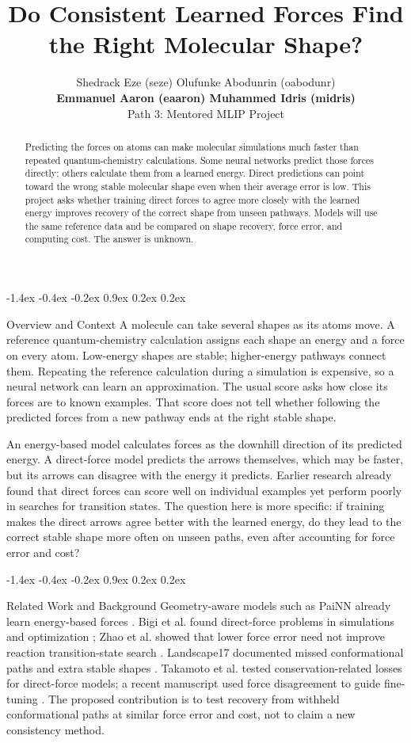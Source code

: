 \documentclass{article}
\title{Do Consistent Learned Forces Find the Right Molecular Shape?}
\author{Shedrack Eze (seze) \quad Olufunke Abodunrin (oabodunr)\\
\textbf{Emmanuel Aaron (eaaron) \quad Muhammed Idris (midris)}\\
Path 3: Mentored MLIP Project}
\makeatletter
\renewcommand{\section}{\@startsection{section}{1}{\z@}%
  {-1.4ex \@plus -0.4ex \@minus -0.2ex}%
  {0.9ex \@plus 0.2ex \@minus 0.2ex}%
  {\large\bf\raggedright}}
\makeatother
\begin{document}
\maketitle

\begin{abstract}
Predicting the forces on atoms can make molecular simulations much faster than repeated quantum-chemistry calculations. Some neural networks predict those forces directly; others calculate them from a learned energy. Direct predictions can point toward the wrong stable molecular shape even when their average error is low. This project asks whether training direct forces to agree more closely with the learned energy improves recovery of the correct shape from unseen pathways. Models will use the same reference data and be compared on shape recovery, force error, and computing cost. The answer is unknown.
\end{abstract}

\section{Overview and Context}
A molecule can take several shapes as its atoms move. A reference quantum-chemistry calculation assigns each shape an energy and a force on every atom. Low-energy shapes are stable; higher-energy pathways connect them. Repeating the reference calculation during a simulation is expensive, so a neural network can learn an approximation. The usual score asks how close its forces are to known examples. That score does not tell whether following the predicted forces from a new pathway ends at the right stable shape.

An energy-based model calculates forces as the downhill direction of its predicted energy. A direct-force model predicts the arrows themselves, which may be faster, but its arrows can disagree with the energy it predicts. Earlier research already found that direct forces can score well on individual examples yet perform poorly in searches for transition states. The question here is more specific: if training makes the direct arrows agree better with the learned energy, do they lead to the correct stable shape more often on unseen paths, even after accounting for force error and cost?

\section{Related Work and Background}
Geometry-aware models such as PaiNN already learn energy-based forces \cite{painn}. Bigi et al. found direct-force problems in simulations and optimization \cite{bigi}; Zhao et al. showed that lower force error need not improve reaction transition-state search \cite{zhao}. Landscape17 documented missed conformational paths and extra stable shapes \cite{landscape}. Takamoto et al. tested conservation-related losses for direct-force models; a recent manuscript used force disagreement to guide fine-tuning \cite{takamoto,disagree}. The proposed contribution is to test recovery from withheld conformational paths at similar force error and cost, not to claim a new consistency method.
\end{document}
